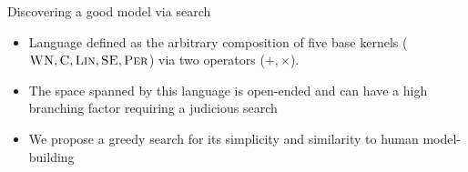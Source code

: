 \begin{frame}{Discovering a good model via search}
  \begin{itemize}
    \item Language defined as the arbitrary composition of five base kernels (${\textsc{WN}}, {\textsc{C}}, {\textsc{Lin}}, {\textsc{SE}}, {\textsc{Per}}$) via two operators ($+, \times$). 
    \vspace{\baselineskip}
    \item The space spanned by this language is open-ended and can have a high branching factor requiring a judicious search
    \vspace{\baselineskip}
    \item We propose a greedy search for its simplicity and similarity to human model-building
  \end{itemize}
\end{frame}

